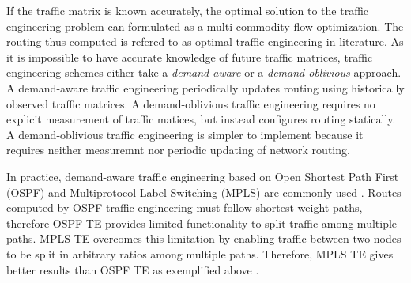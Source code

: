 If the traffic matrix is known accurately, the optimal solution to the traffic engineering problem can formulated as a multi-commodity flow optimization. The routing thus computed is refered to as optimal traffic engineering in literature. As it is impossible to have accurate knowledge of future traffic matrices, traffic engineering schemes either take a \emph{demand-aware} or a \emph{demand-oblivious} approach. A demand-aware  traffic engineering  periodically updates routing using historically observed traffic matrices. A demand-oblivious  traffic engineering  requires no explicit measurement of traffic matices, but instead configures routing statically. A demand-oblivious  traffic engineering  is simpler to implement because it requires neither measuremnt nor periodic updating of network routing. 


In practice, demand-aware traffic engineering based on Open Shortest Path First (OSPF) and Multiprotocol Label Switching (MPLS) are commonly used  \cite{COPE,MultiTM,fortz2000internet,MPLS2}. Routes computed by OSPF traffic engineering must follow shortest-weight paths, therefore OSPF TE provides limited functionality to split traffic among multiple paths. MPLS TE overcomes this limitation by enabling traffic between two nodes to be split  in arbitrary ratios among multiple paths. Therefore, MPLS TE gives better results than OSPF TE as exemplified above \cite{COPE,MultiTM}.



